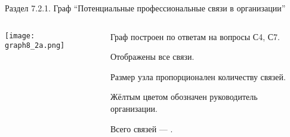 \begin{frame}{Раздел 7.2.1. Граф ``Потенциальные профессиональные связи в организации''}

\begin{columns}
\begin{column}{0.75\textwidth} 
\centering
          \texttt{[image: graph8\_2a.png]}
\end{column}
\begin{column}{0.25\textwidth} 

\tiny
Граф построен по ответам на вопросы С4, С7.
\smallskip

Отображены все связи. 
\smallskip

Размер узла пропорционален количеству связей.
\smallskip

Жёлтым цветом обозначен руководитель организации.
\bigskip

Всего связей --- \valHBAlinks.

\end{column}
\end{columns}
\end{frame}


